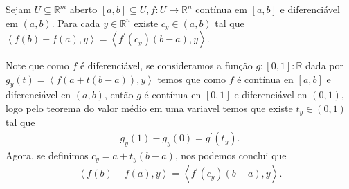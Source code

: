\begin{homeworkProblem}[Seção 3-2]
  Sejam $U\subseteq\mathbb{R}^{m}$ aberto $[a,b]\subseteq U,f:U\to\mathbb{R}^{n}$ contínua em $[a,b]$ e diferenciável em $(a,b)$. Para cada $y\in\mathbb{R}^{n}$ existe $c_y\in (a,b)$ tal que $\left\langle f(b)-f(a),y \right\rangle=\left\langle f^{\prime}(c_y)(b-a),y \right\rangle$.
  \begin{solution}
    Note que como $f$ é diferenciável, se consideramos a função $g:[0,1]:\mathbb{R}$ dada por $g_y(t)=\left\langle f(a+t(b-a)),y \right\rangle$ temos que como $f$ é contínua en $[a,b]$ e diferenciável en $(a,b)$, então $g$ é contínua en $[0,1]$ e diferenciável en $(0,1)$, logo pelo teorema do valor médio em uma variavel temos que existe $t_y\in(0,1)$ tal que 
    \begin{align*}
      g_y(1)-g_y(0)=g^{\prime}(t_y).
    \end{align*}
    Agora, se definimos $c_y=a+t_y(b-a)$, nos podemos conclui que 
    \begin{align*}
      \left\langle f(b)-f(a),y \right\rangle=\left\langle f^{\prime}(c_y)(b-a),y \right\rangle.
    \end{align*}
  \end{solution}
\end{homeworkProblem}
